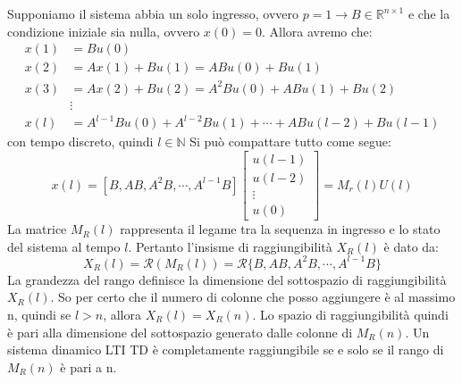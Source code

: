 \begin{tcolorbox}
    Supponiamo il sistema abbia un solo ingresso, ovvero $p=1 \rightarrow B \in
        \mathbb{R}^{n \times 1}$ e che la condizione iniziale sia nulla, ovvero
    $x(0) = 0$. Allora avremo che:
    \begin{align*}
        x(1) & = B u(0)                                                           \\
        x(2) & = A x(1) + B u(1) = A B u(0) + B u(1)                              \\
        x(3) & = A x(2) + B u(2) = A^2 B u(0) + A B u(1) + B u(2)                 \\
             & \vdots                                                             \\
        x(l) & = A^{l-1} B u(0) + A^{l-2} B u(1) + \cdots + A B u(l-2) + B u(l-1)
    \end{align*}
    con tempo discreto, quindi $l \in \mathbb{N}$ Si può compattare tutto come
    segue:
    \begin{equation}
        x(l) = [B, A B, A^2 B, \cdots, A^{l-1} B] \begin{bmatrix}
            u(l-1) \\
            u(l-2) \\
            \vdots \\
            u(0)
        \end{bmatrix} = M_r(l) U(l)
    \end{equation}
    La matrice $M_R(l) $ rappresenta il legame tra la sequenza in ingresso e lo
    stato del sistema al tempo $l$. Pertanto l'insisme di raggiungibilità
    $X_R(l)$ è dato da:
    \begin{equation}
        X_R(l) = \mathcal{R}(M_R(l)) = \mathcal{R} \{B, A B, A^2 B, \cdots, A^{l-1} B\}
    \end{equation}
    La grandezza del rango definisce la dimensione del sottospazio di
    raggiungibilità $X_R(l)$. So per certo che il numero di colonne che posso
    aggiungere è al massimo n, quindi se $l > n$, allora $X_R(l) = X_R(n)$. Lo
    spazio di raggiungibilità quindi è pari alla dimensione del sottospazio
    generato dalle colonne di $M_R(n)$. Un sistema dinamico LTI TD è
    completamente raggiungibile se e solo se il rango di $M_R(n)$ è pari a n.
\end{tcolorbox}

